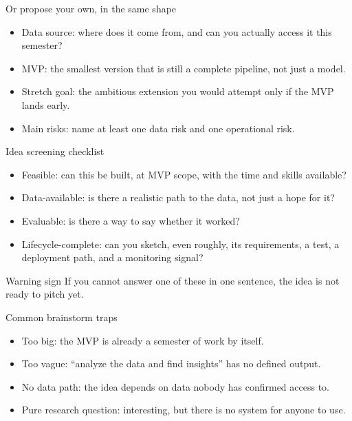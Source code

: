 \begin{frame}{Or propose your own, in the same shape}
\begin{itemize}
\item Data source: where does it come from, and can you actually access it this semester?
\item MVP: the smallest version that is still a complete pipeline, not just a model.
\item Stretch goal: the ambitious extension you would attempt only if the MVP lands early.
\item Main risks: name at least one data risk and one operational risk.
\end{itemize}
\coursefooter
\end{frame}

\begin{frame}{Idea screening checklist}
\begin{itemize}
\item Feasible: can this be built, at MVP scope, with the time and skills available?
\item Data-available: is there a realistic path to the data, not just a hope for it?
\item Evaluable: is there a way to say whether it worked?
\item Lifecycle-complete: can you sketch, even roughly, its requirements, a test, a deployment path, and a monitoring signal?
\end{itemize}
\begin{block}{Warning sign}
If you cannot answer one of these in one sentence, the idea is not ready to pitch yet.
\end{block}
\coursefooter
\end{frame}

\begin{frame}{Common brainstorm traps}
\begin{itemize}
\item Too big: the MVP is already a semester of work by itself.
\item Too vague: ``analyze the data and find insights'' has no defined output.
\item No data path: the idea depends on data nobody has confirmed access to.
\item Pure research question: interesting, but there is no system for anyone to use.
\end{itemize}
\coursefooter
\end{frame}

